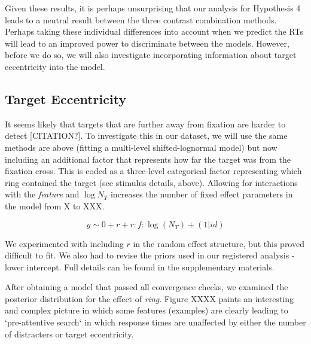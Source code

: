 \documentclass[preprint,12pt,authoryear]{elsarticle}
\begin{document}
Given these results, it is perhaps unsurprising that our analysis for Hypothesis 4 leads to a neutral result between the three contrast combination methods. Perhaps taking these individual differences into account when we predict the RTs will lead to an improved power to discriminate between the models. However, before we do so, we will also investigate incorporating information about target eccentricity into the model.

\subsection{Target Eccentricity}

It seems likely that targets that are further away from fixation are harder to detect [CITATION?]. To investigate this in our dataset, we will use the same methods are above (fitting a multi-level shifted-lognormal model) but now including an additional factor that represents how far the target was from the fixation cross. This is coded as a three-level categorical factor representing which ring contained the target (see stimulus details, above). Allowing for interactions with the \textit{feature} and $\log{N_T}$ increases the number of fixed effect parameters in the model from X to XXX. 

\begin{equation}
y \sim 0 + r + r:f:\log(N_T) + (1|id)
\end{equation}

We experimented with including $r$ in the random effect structure, but this proved difficult to fit. We also had to revise the priors used in our registered analysis - lower intercept. Full details can be found in the supplementary materials. 

After obtaining a model that passed all convergence checks, we examined the posterior distribution for the effect of \textit{ring}. Figure XXXX paints an interesting and complex picture in which some features (examples) are clearly leading to `pre-attentive search` in which response times are unaffected by either the number of distracters or target eccentricity. 
\end{document}
